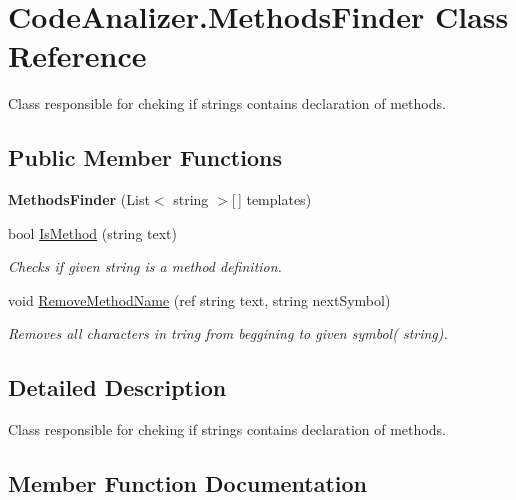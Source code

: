 \hypertarget{class_code_analizer_1_1_methods_finder}{}\section{Code\+Analizer.\+Methods\+Finder Class Reference}
\label{class_code_analizer_1_1_methods_finder}


Class responsible for cheking if strings contains declaration of methods.  


\subsection*{Public Member Functions}
\begin{DoxyCompactItemize}
\item 
\mbox{\label{class_code_analizer_1_1_methods_finder_a1bd99039a246fa522ec4bc1e2a053d09}} 
{\bfseries Methods\+Finder} (List$<$ string $>$\mbox{[}$\,$\mbox{]} templates)
\item 
bool \mbox{\hyperlink{class_code_analizer_1_1_methods_finder_a716c6b6508c289a5e9c3d807525ef49f}{Is\+Method}} (string text)
\begin{DoxyCompactList}\small\item\em Checks if given string is a method definition. \end{DoxyCompactList}\item 
void \mbox{\hyperlink{class_code_analizer_1_1_methods_finder_a206466c8e627761ee4f1058658c942bc}{Remove\+Method\+Name}} (ref string text, string next\+Symbol)
\begin{DoxyCompactList}\small\item\em Removes all characters in tring from beggining to given symbol( string). \end{DoxyCompactList}\end{DoxyCompactItemize}


\subsection{Detailed Description}
Class responsible for cheking if strings contains declaration of methods. 



\subsection{Member Function Documentation}
\mbox{\label{class_code_analizer_1_1_methods_finder_a716c6b6508c289a5e9c3d807525ef49f}} 

